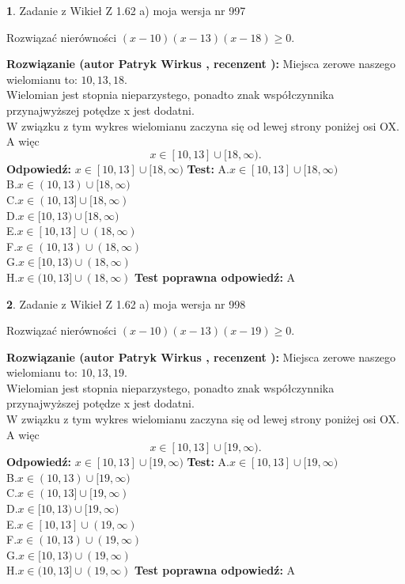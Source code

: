 \documentclass[12pt, a4paper]{article}
\theoremstyle{definition} %
\newtheorem{zad}{}
\newcommand{\zadStart}[1]{\begin{zad}#1\newline}
\newcommand{\zadStop}{\end{zad}}
\newcommand{\rozwStart}[2]{\noindent \textbf{Rozwiązanie (autor #1 , recenzent #2): }\newline}
\newcommand{\rozwStop}{\newline}
\newcommand{\odpStart}{\noindent \textbf{Odpowiedź:}\newline}
\newcommand{\odpStop}{\newline}
\newcommand{\testStart}{\noindent \textbf{Test:}\newline}
\newcommand{\testStop}{\newline}
\newcommand{\kluczStart}{\noindent \textbf{Test poprawna odpowiedź:}\newline}
\newcommand{\kluczStop}{\newline}
\begin{document}
\zadStart{Zadanie z Wikieł Z 1.62 a) moja wersja nr 997}

Rozwiązać nierówności $(x-10)(x-13)(x-18)\ge0$.
\zadStop
\rozwStart{Patryk Wirkus}{}
Miejsca zerowe naszego wielomianu to: $10, 13, 18$.\\
Wielomian jest stopnia nieparzystego, ponadto znak współczynnika przy\linebreak najwyższej potędze x jest dodatni.\\ W związku z tym wykres wielomianu zaczyna się od lewej strony poniżej osi OX. A więc $$x \in [10,13] \cup [18,\infty).$$
\rozwStop
\odpStart
$x \in [10,13] \cup [18,\infty)$
\odpStop
\testStart
A.$x \in [10,13] \cup [18,\infty)$\\
B.$x \in (10,13) \cup [18,\infty)$\\
C.$x \in (10,13] \cup [18,\infty)$\\
D.$x \in [10,13) \cup [18,\infty)$\\
E.$x \in [10,13] \cup (18,\infty)$\\
F.$x \in (10,13) \cup (18,\infty)$\\
G.$x \in [10,13) \cup (18,\infty)$\\
H.$x \in (10,13] \cup (18,\infty)$
\testStop
\kluczStart
A
\kluczStop



\zadStart{Zadanie z Wikieł Z 1.62 a) moja wersja nr 998}

Rozwiązać nierówności $(x-10)(x-13)(x-19)\ge0$.
\zadStop
\rozwStart{Patryk Wirkus}{}
Miejsca zerowe naszego wielomianu to: $10, 13, 19$.\\
Wielomian jest stopnia nieparzystego, ponadto znak współczynnika przy\linebreak najwyższej potędze x jest dodatni.\\ W związku z tym wykres wielomianu zaczyna się od lewej strony poniżej osi OX. A więc $$x \in [10,13] \cup [19,\infty).$$
\rozwStop
\odpStart
$x \in [10,13] \cup [19,\infty)$
\odpStop
\testStart
A.$x \in [10,13] \cup [19,\infty)$\\
B.$x \in (10,13) \cup [19,\infty)$\\
C.$x \in (10,13] \cup [19,\infty)$\\
D.$x \in [10,13) \cup [19,\infty)$\\
E.$x \in [10,13] \cup (19,\infty)$\\
F.$x \in (10,13) \cup (19,\infty)$\\
G.$x \in [10,13) \cup (19,\infty)$\\
H.$x \in (10,13] \cup (19,\infty)$
\testStop
\kluczStart
A
\kluczStop
\end{document}

